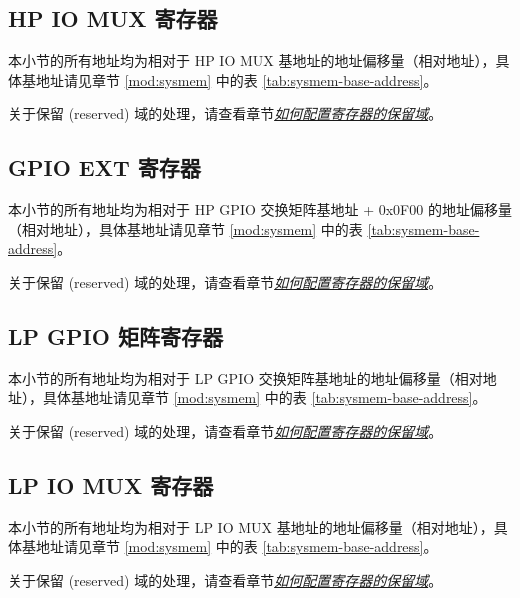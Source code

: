 \documentclass[main\_\_CN.tex]{subfiles}
\begin{document}


\subsection{HP IO MUX 寄存器}
本小节的所有地址均为相对于 HP IO MUX 基地址的地址偏移量（相对地址），具体基地址请见章节 \ref{mod:sysmem} \textit{} 中的表 \ref{tab:sysmem-base-address}。

关于保留 (reserved) 域的处理，请查看章节\hyperref[programming-reserved-field]{\textit{如何配置寄存器的保留域}}。



\subsection{GPIO EXT 寄存器}

本小节的所有地址均为相对于 HP GPIO 交换矩阵基地址 + 0x0F00 的地址偏移量（相对地址），具体基地址请见章节 \ref{mod:sysmem} \textit{} 中的表 \ref{tab:sysmem-base-address}。

关于保留 (reserved) 域的处理，请查看章节\hyperref[programming-reserved-field]{\textit{如何配置寄存器的保留域}}。



\subsection{LP GPIO 矩阵寄存器}
本小节的所有地址均为相对于 LP GPIO 交换矩阵基地址的地址偏移量（相对地址），具体基地址请见章节 \ref{mod:sysmem} \textit{} 中的表 \ref{tab:sysmem-base-address}。

关于保留 (reserved) 域的处理，请查看章节\hyperref[programming-reserved-field]{\textit{如何配置寄存器的保留域}}。



\subsection{LP IO MUX 寄存器}
本小节的所有地址均为相对于 LP IO MUX 基地址的地址偏移量（相对地址），具体基地址请见章节 \ref{mod:sysmem} \textit{} 中的表 \ref{tab:sysmem-base-address}。

关于保留 (reserved) 域的处理，请查看章节\hyperref[programming-reserved-field]{\textit{如何配置寄存器的保留域}}。


\end{document}
